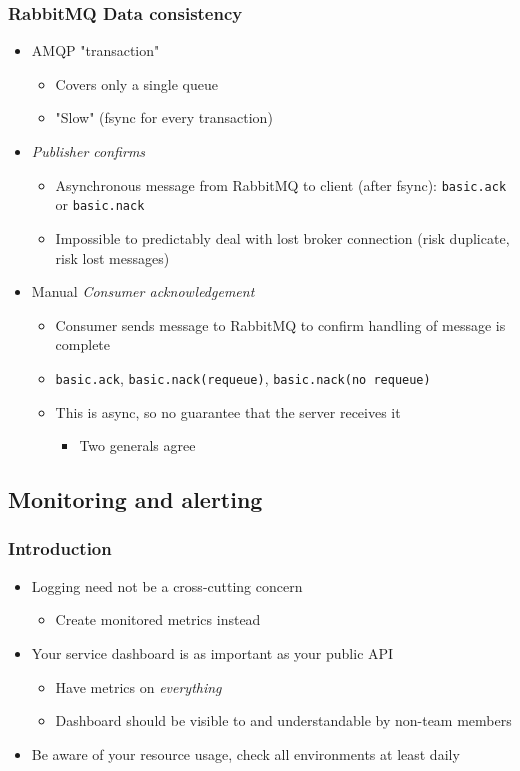 \documentclass[8pt]{article}
\begin{document}
\subsubsection{RabbitMQ Data consistency}
\label{sec:orgef4773a}
\begin{itemize}
\item AMQP "transaction"
\begin{itemize}
\item Covers only a single queue
\item "Slow" (fsync for every transaction)
\end{itemize}
\item \emph{Publisher confirms}
\begin{itemize}
\item Asynchronous message from RabbitMQ to client (after fsync): \texttt{basic.ack} or \texttt{basic.nack}
\item Impossible to predictably deal with lost broker connection (risk duplicate, risk lost messages)
\end{itemize}
\item Manual \emph{Consumer acknowledgement}
\begin{itemize}
\item Consumer sends message to RabbitMQ to confirm handling of message is complete
\item \texttt{basic.ack}, \texttt{basic.nack(requeue)}, \texttt{basic.nack(no requeue)}
\item This is async, so no guarantee that the server receives it
\begin{itemize}
\item Two generals agree
\end{itemize}
\end{itemize}
\end{itemize}
\subsection{Monitoring and alerting}
\label{sec:orgc363e8b}
\subsubsection{Introduction}
\label{sec:org3e081b4}
\begin{itemize}
\item Logging need not be a cross-cutting concern
\begin{itemize}
\item Create monitored metrics instead
\end{itemize}
\item Your service dashboard is as important as your public API
\begin{itemize}
\item Have metrics on \emph{everything}
\item Dashboard should be visible to and understandable by non-team members
\end{itemize}
\item Be aware of your resource usage, check all environments at least daily
\end{itemize}
\end{document}
